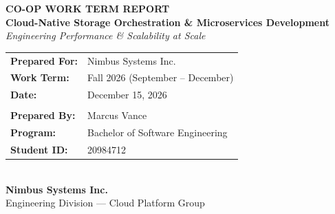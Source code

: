 \begin{titlepage}

\hspace{1.8in}
\begin{minipage}[t]{0.7\textwidth}
  \vspace*{2.0cm}
  
  \textcolor{SecondaryTeal}{\sffamily\large\bfseries CO-OP WORK TERM REPORT}\\[0.4cm]
  {\color{PrimaryBlue}\sffamily\Huge\bfseries Cloud-Native Storage Orchestration \& Microservices Development}\\[0.6cm]
  {\color{PrimaryBlue}\sffamily\Large\itshape Engineering Performance \& Scalability at Scale}\\[2.0cm]
  
  \noindent
  \begin{tabular}{ll}
    \textbf{\textcolor{PrimaryBlue}{\sffamily Prepared For:}} & Nimbus Systems Inc. \\
    \textbf{\textcolor{PrimaryBlue}{\sffamily Work Term:}}    & Fall 2026 (September -- December) \\
    \textbf{\textcolor{PrimaryBlue}{\sffamily Date:}}         & December 15, 2026 \\
    & \\
    \textbf{\textcolor{PrimaryBlue}{\sffamily Prepared By:}} & Marcus Vance \\
    \textbf{\textcolor{PrimaryBlue}{\sffamily Program:}}     & Bachelor of Software Engineering \\
    \textbf{\textcolor{PrimaryBlue}{\sffamily Student ID:}}  & 20984712 \\
  \end{tabular}
  
  \vspace*{3.5cm}
  
  \begin{center}
    \\[0.3cm]
    \textcolor{PrimaryBlue}{\sffamily\bfseries Nimbus Systems Inc.}\\
    \textcolor{PrimaryBlue}{\sffamily Engineering Division --- Cloud Platform Group}
  \end{center}
  
\end{minipage}
\end{titlepage}
